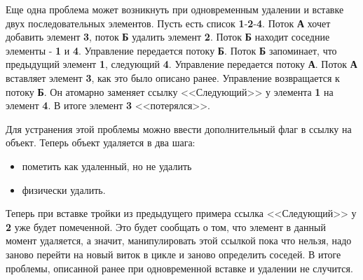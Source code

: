 \documentclass[12pt]{article}
\begin{document}
{				\par Еще одна проблема может возникнуть при одновременным удалении и вставке двух последовательных элементов. Пусть есть список \textbf{1}-\textbf{2}-\textbf{4}. Поток \textbf{А} хочет добавить элемент \textbf{3}, поток \textbf{Б} удалить элемент \textbf{2}. Поток \textbf{Б} находит соседние элементы - \textbf{1} и \textbf{4}. Управление передается потоку \textbf{Б}. Поток \textbf{Б} запоминает, что предыдущий элемент \textbf{1}, следующий \textbf{4}. Управление передается потоку \textbf{А}. Поток \textbf{А} вставляет элемент \textbf{3}, как это было описано ранее. Управление возвращается к потоку \textbf{Б}. Он атомарно заменяет ссылку <<Следующий>> у элемента \textbf{1} на элемент \textbf{4}. В итоге элемент \textbf{3} <<потерялся>>.
				\par Для устранения этой проблемы можно ввести дополнительный флаг в ссылку на объект. Теперь объект удаляется в два шага: 
				\begin{itemize}
					\item пометить как удаленный, но не удалить
					\item физически удалить. 
				\end{itemize}
				Теперь при вставке тройки из предыдущего примера ссылка <<Следующий>> у \textbf{2} уже будет помеченной. Это будет сообщать о том, что элемент в данный момент удаляется, а значит, манипулировать этой ссылкой пока что нельзя, надо заново перейти на новый виток в цикле и заново определить соседей. В итоге проблемы, описанной ранее при одновременной вставке и удалении не случится.
}
\end{document}
